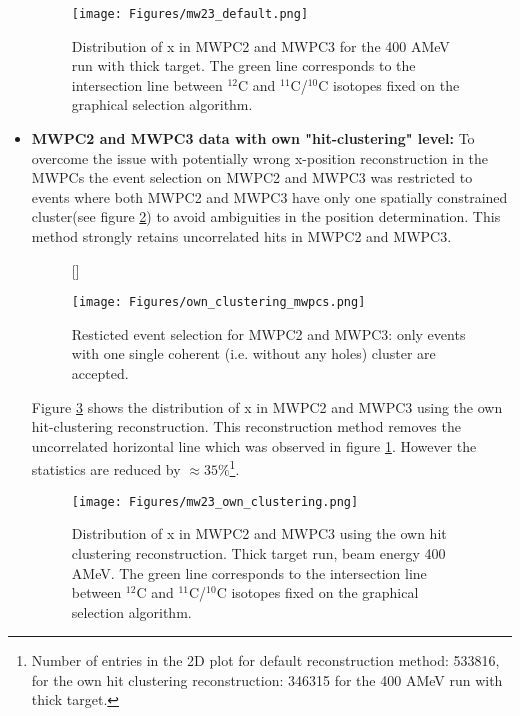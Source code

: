 \begin{itemize}
\begin{figure}[htpb]
    \centering
    \texttt{[image: Figures/mw23\_default.png]}
    \caption{
   	 Distribution of x in MWPC2 and MWPC3 for the 400 AMeV run with thick target. The green line corresponds to the intersection line between $^{12}$C and $^{11}$C/$^{10}$C isotopes fixed on the graphical selection algorithm.
     }
    \label{fig:x_mw23_default}
\end{figure}
\item \textbf{MWPC2 and MWPC3 data with own "hit-clustering" level:}\newline 
To overcome the issue with potentially wrong x-position reconstruction in the MWPCs the event selection on MWPC2 and MWPC3 was restricted to events where both MWPC2 and MWPC3 have only one spatially constrained cluster(see figure \ref{fig:own_clustering}) to avoid ambiguities in the position determination. This method strongly retains uncorrelated hits in MWPC2 and MWPC3.\newline
\begin{figure}
[\FBwidth]
{\caption{Resticted event selection for MWPC2 and MWPC3: only events with one single coherent (i.e. without any holes) cluster are accepted.}\label{fig:own_clustering}}
{\texttt{[image: Figures/own\_clustering\_mwpcs.png]}}
\end{figure}
Figure \ref{fig:mw23_own_clustering} shows the distribution of x in MWPC2 and MWPC3 using the own hit-clustering reconstruction. This reconstruction method removes the uncorrelated horizontal line which was observed in figure \ref{fig:x_mw23_default}. However the statistics are reduced by $\approx 35\%$\footnote{Number of entries in the 2D plot for default reconstruction method: 533816, for the own hit clustering reconstruction: 346315 for the 400 AMeV run with thick target.}.
\begin{figure}[htpb]
    \centering
    \texttt{[image: Figures/mw23\_own\_clustering.png]}
    \caption{
   	 Distribution of x in MWPC2 and MWPC3 using the own hit clustering reconstruction. Thick target run, beam energy 400 AMeV. The green line corresponds to the intersection line between $^{12}$C and $^{11}$C/$^{10}$C isotopes fixed on the graphical selection algorithm.
     }
    \label{fig:mw23_own_clustering}
\end{figure}


\end{itemize}
